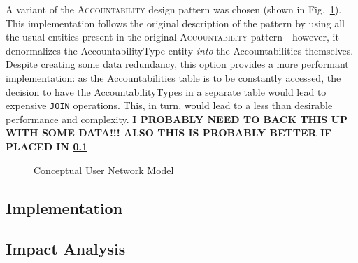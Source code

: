 A variant of the \textsc{Accountability} design pattern was chosen (shown in Fig.~\ref{fig:social_network_conceptual}). This implementation follows the original description of the pattern by using all the usual entities present in the original \textsc{Accountability} pattern \cite{fowler_accountability} - however, it denormalizes the AccountabilityType entity \emph{into} the Accountabilities themselves. Despite creating some data redundancy, this option provides a more performant implementation: as the Accountabilities table is to be constantly accessed, the decision to have the AccountabilityTypes in a separate table would lead to expensive \verb!JOIN! operations. This, in turn, would lead to a less than desirable performance and complexity. \textbf{I PROBABLY NEED TO BACK THIS UP WITH SOME DATA!!! ALSO THIS IS PROBABLY BETTER IF PLACED IN \ref{sec:fa_social_network_implementation}}

\begin{figure}[H]
  \centering
  \caption{Conceptual User Network Model}
  \label{fig:social_network_conceptual}
\end{figure}

\subsection{Implementation}\label{sec:fa_social_network_implementation}

\subsection{Impact Analysis}\label{sec:fa_social_network_impact_analysis}
